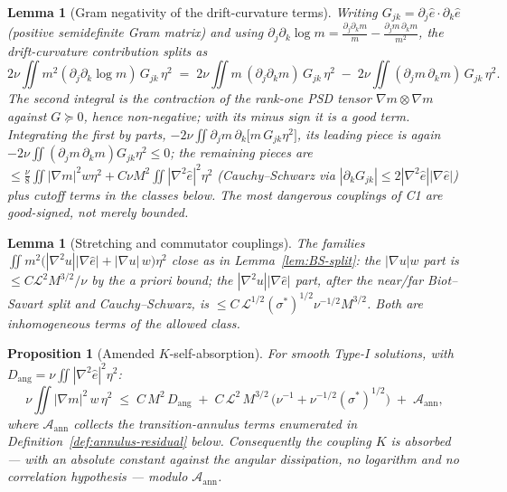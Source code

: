 \documentclass[11pt]{article}
\newtheorem{proposition}[theorem]{Proposition}
\newtheorem{lemma}[theorem]{Lemma}
\theoremstyle{definition}
\theoremstyle{remark}
\begin{document}
\begin{lemma}[Gram negativity of the drift-curvature terms]\label{lem:gram-negativity}
  Writing $G_{jk} = \partial_j\hat{e}\cdot\partial_k\hat{e}$ (positive
  semidefinite Gram matrix) and using
  $\partial_j\partial_k\log m = \tfrac{\partial_j\partial_k m}{m}
  - \tfrac{\partial_j m\,\partial_k m}{m^2}$, the drift-curvature
  contribution splits as
  \[
    2\nu\iint m^2(\partial_j\partial_k\log m)\,G_{jk}\,\eta^2
    \;=\; 2\nu\iint m\,(\partial_j\partial_k m)\,G_{jk}\,\eta^2
    \;-\; 2\nu\iint (\partial_jm\,\partial_km)\,G_{jk}\,\eta^2 .
  \]
  The second integral is the contraction of the rank-one PSD tensor
  $\nabla m\otimes\nabla m$ against $G\succeq 0$, hence
  \emph{non-negative}; with its minus sign it is a good term. Integrating
  the first by parts,
  $-2\nu\iint\partial_jm\,\partial_k\bigl[m\,G_{jk}\eta^2\bigr]$, its
  leading piece is \emph{again} $-2\nu\iint(\partial_jm\,\partial_km)G_{jk}\eta^2\leq 0$;
  the remaining pieces are
  $\leq \tfrac{\nu}{8}\iint|\nabla m|^2w\eta^2 + C\nu M^2\iint|\nabla^2\hat{e}|^2\eta^2$
  (Cauchy--Schwarz via $|\partial_k G_{jk}|\leq 2|\nabla^2\hat{e}||\nabla\hat{e}|$)
  plus cutoff terms in the classes below. \emph{The most dangerous
  couplings of C1 are good-signed, not merely bounded.}
\end{lemma}

\begin{lemma}[Stretching and commutator couplings]\label{lem:stretch-couple}
  The families $\iint m^2\bigl(|\nabla^2 u||\nabla\hat{e}|
  + |\nabla u|\,w\bigr)\eta^2$ close as in
  Lemma~\ref{lem:BS-split}: the $|\nabla u|w$ part is
  $\leq C\mathcal{L}^2M^{3/2}/\nu$ by the a priori bound; the
  $|\nabla^2u||\nabla\hat{e}|$ part, after the near/far Biot--Savart split
  and Cauchy--Schwarz, is
  $\leq C\,\mathcal{L}^{1/2}(\sigma^*)^{1/2}\nu^{-1/2}M^{3/2}$.
  Both are inhomogeneous terms of the allowed class.
\end{lemma}

\begin{proposition}[Amended $K$-self-absorption]\label{prop:K-amended}
  For smooth Type-I solutions, with $D_{\mathrm{ang}} =
  \nu\iint|\nabla^2\hat{e}|^2\eta^2$:
  \[
    \nu\iint|\nabla m|^2\,w\,\eta^2
    \;\leq\; C\,M^2\,D_{\mathrm{ang}}
    \;+\; C\,\mathcal{L}^2\,M^{3/2}\,\bigl(\nu^{-1}
      + \nu^{-1/2}(\sigma^*)^{1/2}\bigr)
    \;+\; \mathcal{A}_{\mathrm{ann}},
  \]
  where $\mathcal{A}_{\mathrm{ann}}$ collects the transition-annulus terms
  enumerated in Definition~\ref{def:annulus-residual} below. Consequently
  the coupling $K$ is absorbed --- with an absolute constant against the
  angular dissipation, no logarithm and no correlation hypothesis ---
  \emph{modulo} $\mathcal{A}_{\mathrm{ann}}$.
\end{proposition}
\end{document}

